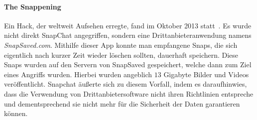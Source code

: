 \paragraph{The Snappening} Ein Hack, der weltweit Aufsehen erregte, fand
im Oktober 2013 statt~\cite{sc_snappening}. Es wurde nicht direkt SnapChat
angegriffen, sondern eine Drittanbieteranwendung namens \emph{SnapSaved.com}.
Mithilfe dieser App konnte man empfangene Snaps, die sich eigentlich nach
kurzer Zeit wieder l\"oschen sollten, dauerhaft speichern. Diese Snaps wurden
auf den Servern von SnapSaved gespeichert, welche dann zum Ziel eines Angriffs
wurden. Hierbei wurden angeblich $13$ Gigabyte\cite{sc_snappening} Bilder und
Videos ver\"offentlicht. Snapchat \"au{\ss}erte sich zu diesem Vorfall, indem
es daraufhinwies, dass die Verwendung von Drittanbietersoftware nicht ihren
Richtlinien entspreche und dementsprechend sie nicht mehr f\"ur die Sicherheit
der Daten garantieren k\"onnen.
